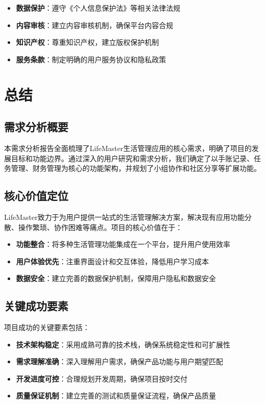 \documentclass[a4paper]{article}
\begin{document}
\begin{itemize}
    \item \textbf{数据保护}：遵守《个人信息保护法》等相关法律法规
    \item \textbf{内容审核}：建立内容审核机制，确保平台内容合规
    \item \textbf{知识产权}：尊重知识产权，建立版权保护机制
    \item \textbf{服务条款}：制定明确的用户服务协议和隐私政策
\end{itemize}

\section{总结}

\subsection{需求分析概要}

本需求分析报告全面梳理了LifeMaster生活管理应用的核心需求，明确了项目的发展目标和功能边界。通过深入的用户研究和需求分析，我们确定了以手账记录、任务管理、财务管理为核心的功能架构，并规划了小组协作和社区分享等扩展功能。

\subsection{核心价值定位}

LifeMaster致力于为用户提供一站式的生活管理解决方案，解决现有应用功能分散、操作繁琐、协作困难等痛点。项目的核心价值在于：

\begin{itemize}
    \item \textbf{功能整合}：将多种生活管理功能集成在一个平台，提升用户使用效率
    \item \textbf{用户体验优先}：注重界面设计和交互体验，降低用户学习成本
    \item \textbf{数据安全}：建立完善的数据保护机制，保障用户隐私和数据安全
\end{itemize}

\subsection{关键成功要素}

项目成功的关键要素包括：

\begin{itemize}
    \item \textbf{技术架构稳定}：采用成熟可靠的技术栈，确保系统稳定性和可扩展性
    \item \textbf{需求理解准确}：深入理解用户需求，确保产品功能与用户期望匹配
    \item \textbf{开发进度可控}：合理规划开发周期，确保项目按时交付
    \item \textbf{质量保证机制}：建立完善的测试和质量保证流程，确保产品质量
\end{itemize}
\end{document}
